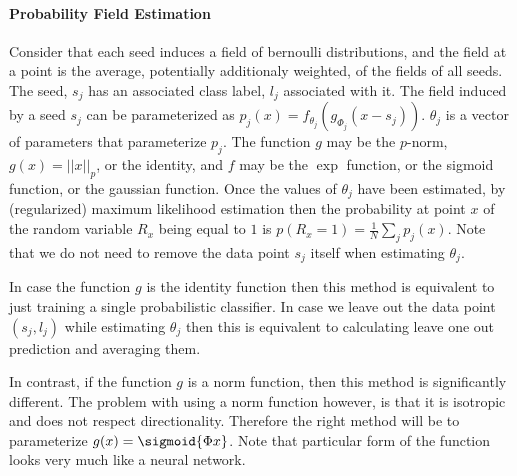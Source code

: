 \documentclass[14pt]{article}
\begin{document}
\paragraph{Probability Field Estimation}
Consider that each seed induces a field of bernoulli distributions, and the
field at a point is the average, potentially additionaly weighted,
of the fields of all seeds. The seed, $s_j$ has an associated class label, $l_j$ associated
with it. The field induced by a seed $s_j$ can be
parameterized as $p_j(x) = f_{\theta_j}(g_{\Phi_j}(x - s_j))$. $\theta_j$ is a vector of
parameters that parameterize $p_j$. The function $g$ may be the
$p$-norm, $g(x) = ||x||_p$, or the identity, and $f$ may be the $\exp$
function, or the sigmoid function, or the gaussian function. Once the values
of $\theta_j$ have been estimated, by (regularized) maximum likelihood estimation
then the probability at point $x$ of the random variable $R_x$ being equal to $1$ is
$p(R_x = 1) = \frac{1}{N} \sum_{j} p_j(x)$. Note that we do not need to remove the data
point $s_j$ itself when estimating $\theta_j$.

In case the function $g$ is the identity function then this method is equivalent
to just training a single probabilistic classifier. In case we leave out the
data point $(s_j, l_j)$ while estimating $\theta_j$ then this is equivalent
to calculating leave one out prediction and averaging them.

In contrast, if the function $g$ is a norm function, then this method is
significantly different. The problem with using a norm function however,
is that it is isotropic and does not respect directionality. Therefore the
right method will be to parameterize $g(x)=\sigmoid{\Phi{x}}$. Note that
particular form of the function looks very much like a neural network.
% 
% 
\end{document}
